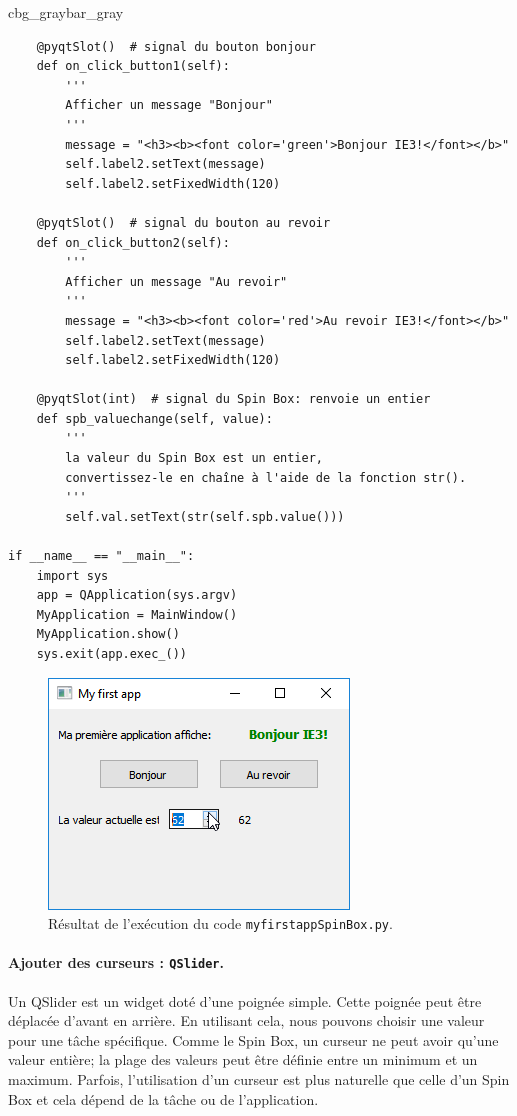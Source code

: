 \documentclass[%
oneside,                 %
final,                   %
10pt,french]{article}
\newenvironment{_pro_tight}[2]{
   \def\FrameCommand{\color{#2}\vrule width 1mm\normalcolor\colorbox{#1}}
   \FrameRule0.6pt\MakeFramed {\advance\hsize-2mm\FrameRestore}\vskip3mm}
   {\vskip0mm\endMakeFramed}
\newenvironment{pro}[2]{
\bgroup\rmfamily
\fboxsep=0mm\relax
\begin{_pro_tight}{#1}{#2}
\list{}{\parsep=-2mm\parskip=0mm\topsep=0pt\leftmargin=2mm
\rightmargin=2\leftmargin\leftmargin=4pt\relax}
\item\relax}
{\endlist\end{_pro_tight}\egroup}
\begin{document}
\begin{pro}{cbg_gray}{bar_gray}
\begin{verbatim}
    @pyqtSlot()  # signal du bouton bonjour
    def on_click_button1(self):
        '''
        Afficher un message "Bonjour"
        '''
        message = "<h3><b><font color='green'>Bonjour IE3!</font></b>"
        self.label2.setText(message)
        self.label2.setFixedWidth(120)

    @pyqtSlot()  # signal du bouton au revoir
    def on_click_button2(self):
        '''
        Afficher un message "Au revoir"
        '''
        message = "<h3><b><font color='red'>Au revoir IE3!</font></b>"
        self.label2.setText(message)
        self.label2.setFixedWidth(120)

    @pyqtSlot(int)  # signal du Spin Box: renvoie un entier
    def spb_valuechange(self, value):
        '''
        la valeur du Spin Box est un entier,
        convertissez-le en chaîne à l'aide de la fonction str().
        '''
        self.val.setText(str(self.spb.value()))

if __name__ == "__main__":
    import sys
    app = QApplication(sys.argv)
    MyApplication = MainWindow()
    MyApplication.show()
    sys.exit(app.exec_())
\end{verbatim}
\end{pro}
\noindent


\begin{figure}[!ht]  %
  \centerline{\includegraphics[width=0.4\linewidth]{imgs/myfirstappSpinBox2.png}}
  \caption{
  Résultat de l'exécution du code \texttt{myfirstappSpinBox.py}. \label{fig:myfirstappSpinBox}
  }
\end{figure}


\paragraph{Ajouter des curseurs : \texttt{QSlider}.}
Un QSlider est un widget doté d'une poignée simple. Cette poignée peut être déplacée d'avant en arrière. En utilisant cela, nous pouvons choisir une valeur pour une tâche spécifique. Comme le Spin Box, un curseur ne peut avoir qu'une valeur entière; la plage des valeurs peut être définie entre un minimum et un maximum. Parfois, l’utilisation d’un curseur est plus naturelle que celle d’un Spin Box et cela dépend de la tâche ou de l’application.
\end{document}
